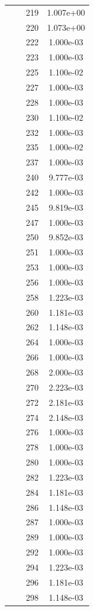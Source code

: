 \documentclass[12pt]{article}
\begin{document}
\begin{longtable}{@{}cccc@{}}
 &  & 219 & 1.007e+00 \\
 &  & 220 & 1.073e+00 \\
 &  & 222 & 1.000e-03 \\
 &  & 223 & 1.000e-03 \\
 &  & 225 & 1.100e-02 \\
 &  & 227 & 1.000e-03 \\
 &  & 228 & 1.000e-03 \\
 &  & 230 & 1.100e-02 \\
 &  & 232 & 1.000e-03 \\
 &  & 235 & 1.000e-02 \\
 &  & 237 & 1.000e-03 \\
 &  & 240 & 9.777e-03 \\
 &  & 242 & 1.000e-03 \\
 &  & 245 & 9.819e-03 \\
 &  & 247 & 1.000e-03 \\
 &  & 250 & 9.852e-03 \\
 &  & 251 & 1.000e-03 \\
 &  & 253 & 1.000e-03 \\
 &  & 256 & 1.000e-03 \\
 &  & 258 & 1.223e-03 \\
 &  & 260 & 1.181e-03 \\
 &  & 262 & 1.148e-03 \\
 &  & 264 & 1.000e-03 \\
 &  & 266 & 1.000e-03 \\
 &  & 268 & 2.000e-03 \\
 &  & 270 & 2.223e-03 \\
 &  & 272 & 2.181e-03 \\
 &  & 274 & 2.148e-03 \\
 &  & 276 & 1.000e-03 \\
 &  & 278 & 1.000e-03 \\
 &  & 280 & 1.000e-03 \\
 &  & 282 & 1.223e-03 \\
 &  & 284 & 1.181e-03 \\
 &  & 286 & 1.148e-03 \\
 &  & 287 & 1.000e-03 \\
 &  & 289 & 1.000e-03 \\
 &  & 292 & 1.000e-03 \\
 &  & 294 & 1.223e-03 \\
 &  & 296 & 1.181e-03 \\
 &  & 298 & 1.148e-03 \\

\bottomrule
\end{longtable}
\end{document}
